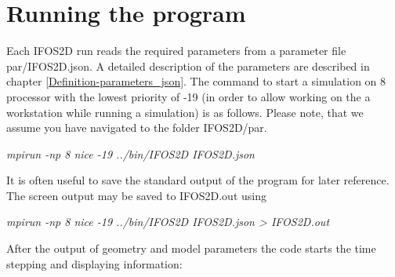 \section{Running the program}\label{compexec1} 
Each IFOS2D run reads the required parameters from a parameter file par/IFOS2D.json. A detailed description of the parameters are described in chapter \ref{Definition-parameters_json}. 
The command to start a simulation on 8 processor with the lowest priority of -19 (in order to allow working on the a workstation while running a simulation) is as follows. Please note, that we assume you have navigated to the folder IFOS2D/par.
\newline

\textit{mpirun -np 8 nice -19 ../bin/IFOS2D IFOS2D.json }
\newline

It is often useful to save the standard output of the program for later reference. The screen output may be saved to IFOS2D.out using
\newline

\textit{mpirun -np 8 nice -19 ../bin/IFOS2D IFOS2D.json > IFOS2D.out}
\newline


After the output of geometry and model parameters the code starts the time stepping and displaying information:

